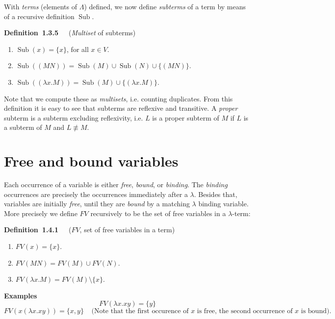 \documentclass[letterpaper]{article}
\newenvironment{examplesNonNum}[1][]{\par\medskip
	\noindent \textbf{Examples}~~~#1 \rmfamily}{\medskip}
\newenvironment{definition}[2][]{\par\medskip
	\noindent \textbf{Definition~#2}~~~#1 \rmfamily}{\medskip}
\DeclareMathOperator{\Sub}{Sub}
\begin{document}
With \emph{terms} (elements of $\Lambda$) defined, we now define \emph{subterms} of a term by means of a recursive definition $\Sub$.

\begin{definition}[(\emph {Multiset} of subterms)]{1.3.5}
	\begin{enumerate}
		\item $\Sub(x) = \{x\}$, for all $x \in V$.
		\item $\Sub((M N)) = \Sub(M) \cup \Sub(N) \cup \{(M N)\}$.
		\item $\Sub((\lambda x.M)) = \Sub(M) \cup \{(\lambda x.M)\}$.
	\end{enumerate}
	Note that we compute these as \emph{multisets}, i.e. counting duplicates.
\end{definition}
From this definition it is easy to see that subterms are reflexive and transitive. A \emph{proper} subterm is a subterm excluding reflexivity, i.e. $L$ is a proper subterm of $M$ if $L$ is a subterm of $M$ and $L \not \equiv M$.

\section{Free and bound variables}
Each occurrence of a variable is either \emph{free}, \emph{bound}, or \emph{binding}. The \emph{binding} occurrences are precisely the occurrences immediately after a $\lambda$. Besides that, variables are initially \emph{free}, until they are \emph{bound} by a matching $\lambda$ binding variable. More precisely we define $FV$ recursively to be the set of free variables in a $\lambda$-term:

\begin{definition}[($FV$, set of free variables in a term)]{1.4.1}
	\begin{enumerate}
		\item $FV(x) = \{x\}$.
		\item $FV(M N) = FV(M) \cup FV(N)$.
		\item $FV(\lambda x. M) = FV(M) \setminus \{x\}$.
	\end{enumerate}
\end{definition}

\begin{examplesNonNum}
\[
	FV(\lambda x.x y) = \{y\}
\]
\[
	FV(x(\lambda x. x y)) = \{x, y\} \;\;\;\;\textrm{(Note that the first occurence of $x$ is free, the second occurrence of $x$ is bound)}.
\]
\end{examplesNonNum}
\end{document}
